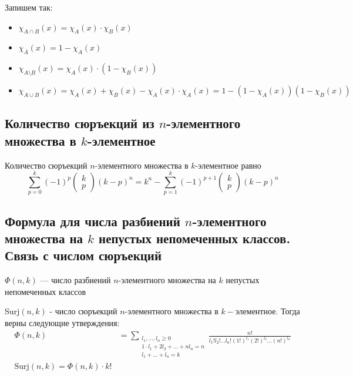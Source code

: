 \documentclass[a4paper]{article}
\begin{document}
Запишем так:
\begin{itemize}
    \item $\chi_{A\cap B}(x)=\chi_A(x)\cdot\chi_B(x)$
    \item $\chi_{\overline{A}}(x)=1-\chi_A(x)$
    \item $\chi_{A\setminus B}(x)=\chi_A(x)\cdot(1-\chi_B(x))$
    \item $\chi_{A\cup B}(x)=\chi_A(x)+\chi_B(x)-\chi_A(x)\cdot\chi_A(x)=1-(1-\chi_A(x))(1-\chi_B(x))$
\end{itemize}

\subsection{Количество сюръекций из $n$-элементного множества в $k$-элементное}
Количество сюръекций $n$-элементного множества в $k$-элементное равно
\begin{equation*}
    \sum\limits_{p=0}^k (-1)^p\begin{pmatrix}
        k\\
        p
    \end{pmatrix}(k-p)^n=k^n-\sum\limits_{p=1}^k (-1)^{p+1}\begin{pmatrix}
        k\\
        p
    \end{pmatrix}(k-p)^n
\end{equation*}

\subsection{Формула для числа разбиений $n$-элементного множества на $k$ непустых непомеченных классов. Связь с числом сюръекций}
 $\Phi(n,k)$ — число разбиений $n$-элементного множества на $k$ непустых непомеченных классов

 Surj$(n,k)$ - число сюръекций $n$-элементного множества в $k-$элементное. Тогда верны следующие утверждения:
\begin{equation*}
    \begin{aligned}
        \Phi(n,k)&=\sum\limits_{\substack{l_1,\ldots,l_n\geqslant0\\1\cdot l_1+2l_2+\ldots+nl_n=n\\l_1+\ldots+l_n=k}} \frac{n!}{l_1!l_2!\ldots l_n!(1!)^{l_1}(2!)^{l_2}\ldots(n!)^{l_n}}\\
        \text{Surj}(n,k)=\Phi(n,k)\cdot k!
    \end{aligned}
\end{equation*}
\end{document}
